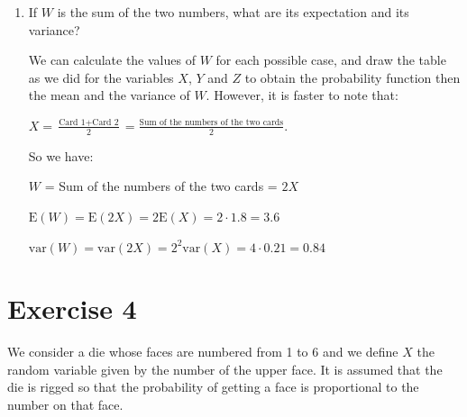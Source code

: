 \documentclass[12pt,thmsa]{article}
\begin{document}
\begin{enumerate}
\begin{itemize}
\end{itemize}		
    \item If $W$ is the sum of the two numbers, what are its expectation and its variance?

We can calculate the values of $ W $ for each possible case, and draw the table as we did for the variables $ X $, $ Y $ and $ Z $ to obtain the probability function then the mean and the variance of $ W $. However, it is faster to note that:
\begin{center}
$\displaystyle X= \frac{\textrm{Card 1} + \textrm{Card 2}}{2}=\frac{\textrm{Sum of the numbers of the two cards}}{2}.$
\end{center}
So we have:
\begin{center}

$W$ = Sum of the numbers of the two cards = $2X$
\medskip

$\mbox{E}(W) = \mbox{E}(2X) = 2\mbox{E}(X) = 2 \cdot 1.8 = 3.6$
\medskip

$\mbox{var}(W) = \mbox{var}(2X) = 2^2\mbox{var}(X) = 4\cdot 0.21 = 0.84$

\end{center}

\end{enumerate}




\section*{Exercise 4} %

We consider a die whose faces are numbered from 1 to 6 and we define $X$ the random variable given by the number of the upper face. It is assumed that the die is rigged so that the probability of getting a face is proportional to the number on that face.
\end{document}
